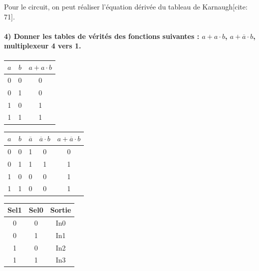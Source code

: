 \documentclass[11pt,a4paper]{article}
\begin{document}
Pour le circuit, on peut réaliser l'équation dérivée du tableau de Karnaugh[cite: 71].

\paragraph{4) Donner les tables de vérités des fonctions suivantes : $a+a\cdot b$, $a+\overline{a}\cdot b$, multiplexeur 4 vers 1.}

\begin{table}[h!]
    \centering
    \begin{tabular}{cc|c}
        \toprule
        $a$ & $b$ & $a+a\cdot b$ \\
        \midrule
        0 & 0 & 0 \\
        0 & 1 & 0 \\
        1 & 0 & 1 \\
        1 & 1 & 1 \\
        \bottomrule
    \end{tabular}
\end{table}

\begin{table}[h!]
    \centering
    \begin{tabular}{cc|cc|c}
        \toprule
        $a$ & $b$ & $\overline{a}$ & $\overline{a}\cdot b$ & $a+\overline{a}\cdot b$ \\
        \midrule
        0 & 0 & 1 & 0 & 0 \\
        0 & 1 & 1 & 1 & 1 \\
        1 & 0 & 0 & 0 & 1 \\
        1 & 1 & 0 & 0 & 1 \\
        \bottomrule
    \end{tabular}
\end{table}

\begin{table}[h!]
    \centering
    \begin{tabular}{cc|c}
        \toprule
        Sel1 & Sel0 & Sortie \\
        \midrule
        0 & 0 & In0 \\
        0 & 1 & In1 \\
        1 & 0 & In2 \\
        1 & 1 & In3 \\
        \bottomrule
    \end{tabular}
\end{table}
\end{document}
